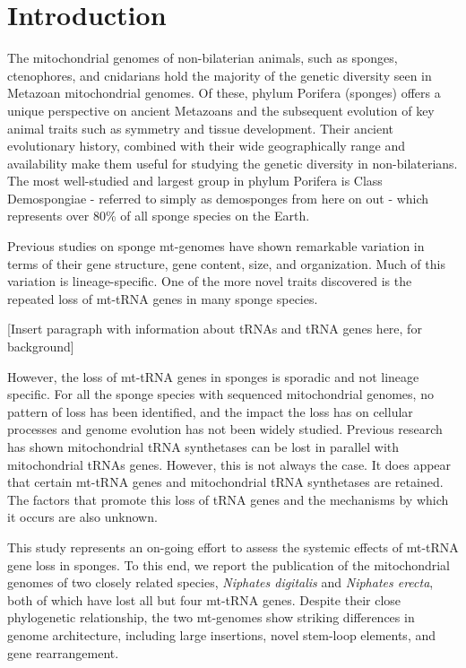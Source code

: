 \documentclass[../main.tex]{subfiles}
\begin{document}
\newpage
\section{Introduction}

The mitochondrial genomes of non-bilaterian animals, such as sponges, ctenophores, and cnidarians hold the majority of the genetic diversity seen in Metazoan mitochondrial genomes. Of these, phylum Porifera (sponges) offers a unique perspective on ancient Metazoans and the subsequent evolution of key animal traits such as symmetry and tissue development. Their ancient evolutionary history, combined with their wide geographically range and availability make them useful for studying the genetic diversity in non-bilaterians. The most well-studied and largest group in phylum Porifera is Class Demospongiae - referred to simply as demosponges from here on out - which represents over 80\% of all sponge species on the Earth.

Previous studies on sponge mt-genomes have shown remarkable variation in terms of their gene structure, gene content, size, and organization. Much of this variation is lineage-specific. One of the more novel traits discovered is the repeated loss of mt-tRNA genes in many sponge species. 

[Insert paragraph with information about tRNAs and tRNA genes here, for background]

However, the loss of mt-tRNA genes in sponges is sporadic and not lineage specific. For all the sponge species with sequenced mitochondrial genomes, no pattern of loss has been identified, and the impact the loss has on cellular processes and genome evolution has not been widely studied. Previous research has shown mitochondrial tRNA synthetases can be lost in parallel with mitochondrial tRNAs genes. However, this is not always the case. It does appear that certain mt-tRNA genes and mitochondrial tRNA synthetases are retained. The factors that promote this loss of tRNA genes and the mechanisms by which it occurs are also unknown. 

This study represents an on-going effort to assess the systemic effects of mt-tRNA gene loss in sponges. To this end, we report the publication of the mitochondrial genomes of two closely related species, \emph{Niphates digitalis} and \emph{Niphates erecta}, both of which have lost all but four mt-tRNA genes. Despite their close phylogenetic relationship, the two mt-genomes show striking differences in genome architecture, including large insertions, novel stem-loop elements, and gene rearrangement. 
\end{document}
